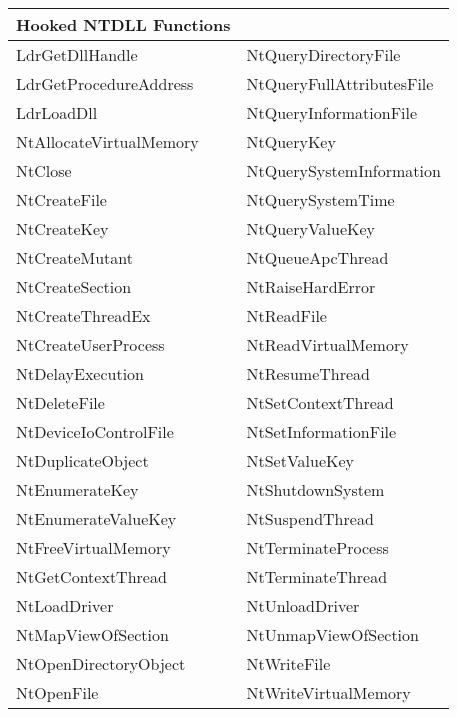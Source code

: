 \begin{tabular}[t]{|l|l|}
\hline
\textbf{Hooked NTDLL Functions} & \\
\hline
LdrGetDllHandle                  &NtQueryDirectoryFile             \\
LdrGetProcedureAddress           &NtQueryFullAttributesFile        \\
LdrLoadDll                       &NtQueryInformationFile           \\
NtAllocateVirtualMemory          &NtQueryKey                       \\
NtClose                          &NtQuerySystemInformation         \\
NtCreateFile                     &NtQuerySystemTime                \\
NtCreateKey                      &NtQueryValueKey                  \\
NtCreateMutant                   &NtQueueApcThread                 \\
NtCreateSection                  &NtRaiseHardError                 \\
NtCreateThreadEx                 &NtReadFile                       \\
NtCreateUserProcess              &NtReadVirtualMemory              \\
NtDelayExecution                 &NtResumeThread                   \\
NtDeleteFile                     &NtSetContextThread               \\
NtDeviceIoControlFile            &NtSetInformationFile             \\
NtDuplicateObject                &NtSetValueKey                    \\
NtEnumerateKey                   &NtShutdownSystem                 \\
NtEnumerateValueKey              &NtSuspendThread                  \\
NtFreeVirtualMemory              &NtTerminateProcess               \\
NtGetContextThread               &NtTerminateThread                \\
NtLoadDriver                     &NtUnloadDriver                   \\
NtMapViewOfSection               &NtUnmapViewOfSection             \\
NtOpenDirectoryObject            &NtWriteFile                      \\
NtOpenFile                       &NtWriteVirtualMemory             \\

\end{tabular}
